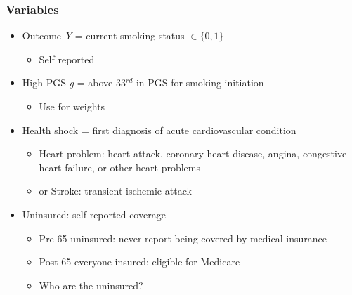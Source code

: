 \documentclass[10pt,compress,xcolor=dvipsnames,aspectratio=169]{beamer}    %
\newcounter{ex}
\newcommand{\1}[1]{\mathrm{1\hspace*{-2.5pt}l}[#1]}	%
\begin{document}
\begin{frame}\frametitle{Variables} \label{frame:vars}

\begin{itemize}
	\item Outcome \textit{\color{Verde} Y} = current smoking status $\in \{0,1\}$
	\begin{itemize}
		\item Self reported
	\end{itemize}

	\smallskip

	\item High PGS \textit{\color{Verde} g} = above 33$^{rd}$ in PGS for smoking initiation
	\begin{itemize}
		\item Use \cite{GSCAN2019gwas} for weights
	\end{itemize}

	\smallskip

	\item Health {\color{Verde} shock} = first diagnosis of acute cardiovascular condition
	\begin{itemize}
		\item Heart problem: heart attack, coronary heart disease, angina, congestive heart
failure, or other heart problems
		\item or Stroke: transient ischemic attack
	\end{itemize}

	\smallskip

	\item {\color{Verde} Uninsured}: self-reported coverage
	\begin{itemize}
		\item Pre 65 uninsured: never report being covered by medical insurance
		\item Post 65 everyone insured: eligible for Medicare
		\item Who are the uninsured? \hyperlink{frame:uninsured}{\beamergotobutton{}}
	\end{itemize}
\end{itemize}

\end{frame}
\end{document}

